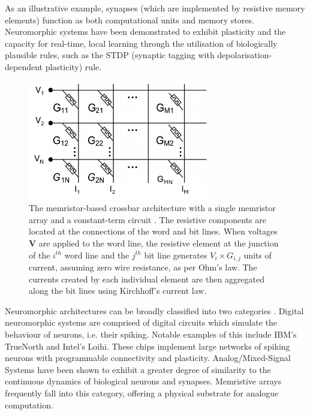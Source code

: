 \noindent As an illustrative example, synapses (which are implemented by resistive memory elements) function as both computational units and memory stores. Neuromorphic systems have been demonstrated to exhibit plasticity and the capacity for real-time, local learning through the utilisation of biologically plausible rules, such as the STDP (synaptic tagging with depolarisation-dependent plasticity) rule. \\


\begin{figure}[htbp!] 
    \centering    
    \includegraphics[width=0.7\textwidth]{Chapter2/Figs/h.png}
    \caption[The memristor-based crossbar architecture.]{The memristor-based crossbar architecture with a single memristor array and a constant-term circuit \cite{truong2014new}. The resistive components are located at the connections of the word and bit lines. When voltages $\mathbf{V}$ are applied to the word line, the resistive element at the junction of the $i^{th}$ word line and the $j^{th}$ bit line generates $V_i \times G_{i,j}$ units of current, assuming zero wire resistance, as per Ohm's law. The currents created by each individual element are then aggregated along the bit lines using Kirchhoff's current law.}
    \label{fig:2h}
\end{figure}


\noindent Neuromorphic architectures can be broadly classified into two categories \cite{ceolini2020hand}. Digital neuromorphic systems are comprised of digital circuits which simulate the behaviour of neurons, i.e. their spiking. Notable examples of this include IBM's TrueNorth and Intel's Loihi. These chips implement large networks of spiking neurons with programmable connectivity and plasticity. Analog/Mixed-Signal Systems have been shown to exhibit a greater degree of similarity to the continuous dynamics of biological neurons and synapses. Memristive arrays frequently fall into this category, offering a physical substrate for analogue computation.\\

